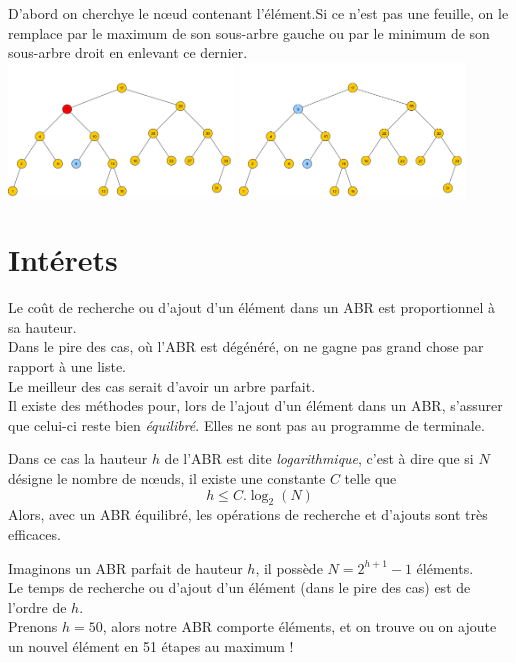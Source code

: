 \documentclass[10pt,firamath,cours]{nsi}
\begin{document}
\begin{methode}
    D'abord on cherchye le n\oe ud contenant l'élément.Si ce n'est pas une feuille, on le remplace par le maximum de son sous-arbre gauche ou par le minimum de son sous-arbre droit en enlevant ce dernier.\\
    \includegraphics[width=6cm]{img/suppr/suppr1} \hspace{2em}
    \includegraphics[width=6cm]{img/suppr/suppr2}
\end{methode}
\section{Intérets}

Le coût de recherche ou d'ajout d'un élément dans un ABR est proportionnel à sa hauteur.\\

Dans le pire des cas, où l'ABR est dégénéré, on ne gagne pas grand chose par rapport à une liste.\\

Le meilleur des cas serait d'avoir un arbre parfait.\\

Il existe des méthodes pour, lors de l'ajout  d'un élément dans un ABR, s'assurer que celui-ci reste bien \textit{équilibré}. Elles ne sont pas au programme de terminale.

Dans ce cas la hauteur $h$ de l'ABR est dite \textit{logarithmique}, c'est à dire que si $N$ désigne le nombre de n\oe uds, il existe une constante $C$ telle que 
$$h\leqslant C.\log_2(N)$$
Alors, avec un ABR équilibré, les opérations de recherche et d'ajouts sont très efficaces.

\begin{exemple}[]
    Imaginons un ABR parfait de hauteur $h$, il possède $N=2^{h+1}-1$ éléments.\\
    Le temps de recherche ou d'ajout d'un élément (dans le pire des cas) est de l'ordre de $h$.\\
    
    Prenons $h=50$, alors notre ABR comporte  éléments, et on trouve ou on ajoute un nouvel élément en 51 étapes au maximum ! 
\end{exemple}
\end{document}
